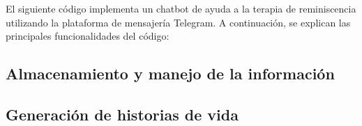 El siguiente código implementa un chatbot de ayuda a la terapia de reminiscencia utilizando la plataforma de mensajería Telegram. A continuación, se explican las principales funcionalidades del código:

	
	
		
		
	



\subsection{Almacenamiento y manejo de la información}

\subsection{Generación de historias de vida}